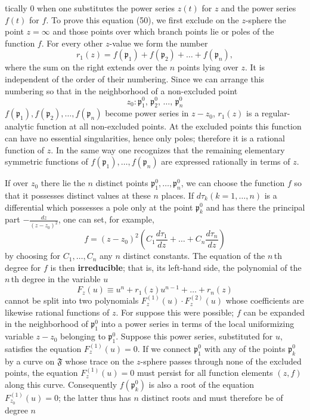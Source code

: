 \documentclass{article}
\begin{document}
tically 0 when one substitutes the power series $z(t)$ for $z$ and the power series $f(t)$ for $f$. To prove this equation (50), we first exclude on the $z$-sphere the point $z = \infty$ and those points over which branch points lie or poles of the function $f$. For every other $z$-value we form the number
\[ r_1(z) = f(\mathfrak{p}_1) + f(\mathfrak{p}_2) + \dots + f(\mathfrak{p}_n), \]
where the sum on the right extends over the $n$ points lying over $z$. It is independent of the order of their numbering. Since we can arrange this numbering so that in the neighborhood of a non-excluded point
\[ z_0 \colon \mathfrak{p}_1^0, \, \mathfrak{p}_2^0, \, \dots, \, \mathfrak{p}_n^0 \]
$f(\mathfrak{p}_1), f(\mathfrak{p}_2), \dots, f(\mathfrak{p}_n)$ become power series in $z - z_0$, $r_1(z)$ is a regular-analytic function at all non-excluded points. At the excluded points this function can have no essential singularities, hence only poles; therefore it is a rational function of $z$. In the same way one recognizes that the remaining elementary symmetric functions of $f(\mathfrak{p}_1), \dots, f(\mathfrak{p}_n)$ are expressed rationally in terms of $z$.

If over $z_0$ there lie the $n$ distinct points $\mathfrak{p}_1^0, \dots, \mathfrak{p}_n^0$, we can choose the function $f$ so that it possesses distinct values at these $n$ places. If $d\tau_k (k = 1, \dots, n)$ is a differential which possesses a pole only at the point $\mathfrak{p}_k^0$ and has there the principal part $-\frac{dz}{(z - z_0)^2}$, one can set, for example,
\[ f = (z - z_0)^2 \left( C_1 \frac{d\tau_1}{dz} + \dots + C_n \frac{d\tau_n}{dz} \right) \]
by choosing for $C_1, \dots, C_n$ any $n$ distinct constants. The equation of the $n$\,th degree for $f$ is then \textbf{irreducible}; that is, its left-hand side, the polynomial of the $n$\,th degree in the variable $u$
\[ F_z(u) \equiv u^n + r_1(z) u^{n-1} + \dots + r_n(z) \]
cannot be split into two polynomials $F_z^{(1)}(u) \cdot F_z^{(2)}(u)$ whose coefficients are likewise rational functions of $z$. For suppose this were possible; $f$ can be expanded in the neighborhood of $\mathfrak{p}_1^0$ into a power series in terms of the local uniformizing variable $z - z_0$ belonging to $\mathfrak{p}_1^0$. Suppose this power series, substituted for $u$, satisfies the equation $F_z^{(1)}(u) = 0$. If we connect $\mathfrak{p}_1^0$ with any of the points $\mathfrak{p}_k^0$ by a curve on $\mathfrak{F}$ whose trace on the $z$-sphere passes through none of the excluded points, the equation $F_z^{(1)}(u) = 0$ must persist for all function elements $(z, f)$ along this curve. Consequently $f(\mathfrak{p}_k^0)$ is also a root of the equation $F_{z_0}^{(1)}(u) = 0$; the latter thus has $n$ distinct roots and must therefore be of degree $n$
\end{document}
